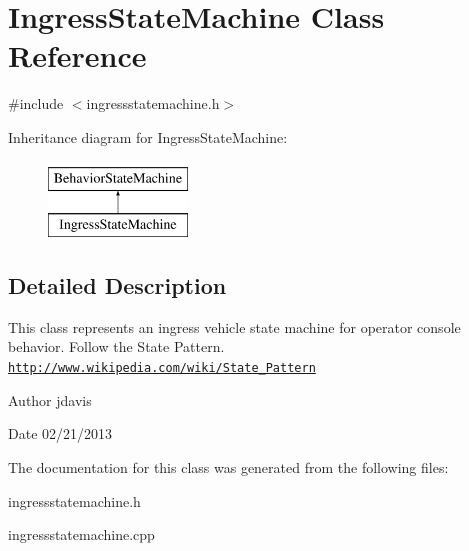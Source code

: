 \hypertarget{classIngressStateMachine}{\section{Ingress\-State\-Machine Class Reference}
\label{classIngressStateMachine}
}


{\ttfamily \#include $<$ingressstatemachine.\-h$>$}

Inheritance diagram for Ingress\-State\-Machine\-:\begin{figure}[H]
\begin{center}
\leavevmode
\includegraphics[height=2.000000cm]{classIngressStateMachine}
\end{center}
\end{figure}


\subsection{Detailed Description}
This class represents an ingress vehicle state machine for operator console behavior. Follow the State Pattern. \href{http://www.wikipedia.com/wiki/State_Pattern}{\tt http\-://www.\-wikipedia.\-com/wiki/\-State\-\_\-\-Pattern}

\begin{DoxyAuthor}{Author}
jdavis 
\end{DoxyAuthor}
\begin{DoxyDate}{Date}
02/21/2013 
\end{DoxyDate}


The documentation for this class was generated from the following files\-:\begin{DoxyCompactItemize}
\item 
ingressstatemachine.\-h\item 
ingressstatemachine.\-cpp\end{DoxyCompactItemize}
